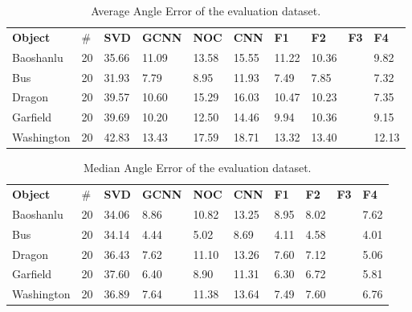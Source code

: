 \documentclass[border=15pt, multi, tikz]{article}
\newcommand{\tabhead}[1]{\textbf{#1}}
\begin{document}
\begin{table}[H]
	\centering
	\begin{tabular}{l l | l | l l l | l l l l }
		\tabhead{Object} & $ \# $ & \tabhead{SVD} & \tabhead{GCNN} & \tabhead{NOC} & \tabhead{CNN} & \tabhead{F1}& \tabhead{F2}& \tabhead{F3}& \tabhead{F4}\\
		Baoshanlu  		& 20 & 35.66 & 11.09 & 13.58 & 15.55 & 11.22 & 10.36 & & 9.82 \\ 
		\hline
		Bus 			& 20 & 31.93 & 7.79 & 8.95 & 11.93 & 7.49 & 7.85 & & 7.32\\ 
		\hline
		Dragon 			& 20 & 39.57 & 10.60 & 15.29 & 16.03 & 10.47 & 10.23 & & 7.35 \\
		\hline
		Garfield 		& 20 & 39.69 & 10.20 & 12.50 & 14.46 & 9.94 & 10.36 & & 9.15 \\
		\hline
		Washington 		& 20 & 42.83 & 13.43 & 17.59 & 18.71 & 13.32 & 13.40 & & 12.13\\
	\end{tabular}
	\caption{Average Angle Error of the evaluation dataset.}	
	\label{tab:eval-mean}
\end{table}

\begin{table}[H]
	\centering
	\begin{tabular}{l l | l | l l l | l l l l }
		\tabhead{Object} & $ \# $ & \tabhead{SVD} & \tabhead{GCNN} & \tabhead{NOC} & \tabhead{CNN} & \tabhead{F1}& \tabhead{F2}& \tabhead{F3}& \tabhead{F4}\\
		Baoshanlu  		& 20 & 34.06 & 8.86 & 10.82 & 13.25 & 8.95 & 8.02 & & 7.62 \\ 
		\hline
		Bus 			& 20 & 34.14 & 4.44 & 5.02 & 8.69 & 4.11 & 4.58 & & 4.01 \\ 
		\hline
		Dragon 			& 20 & 36.43 & 7.62 & 11.10 & 13.26 & 7.60 & 7.12 & & 5.06 \\
		\hline
		Garfield 		& 20 & 37.60 & 6.40 & 8.90 &11.31 & 6.30 & 6.72 & & 5.81\\
		\hline
		Washington 		& 20 & 36.89 & 7.64 & 11.38 & 13.64& 7.49 & 7.60 & & 6.76\\
	\end{tabular}
	\caption{Median Angle Error of the evaluation dataset.}	
	\label{tab:eval-median}
\end{table}
\end{document}
